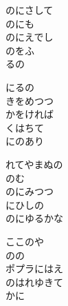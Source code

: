 \documentclass[10pt,b5j]{tarticle} %
\begin{document}
\vspace{1.5em} %
\newcommand{\linespace}{0.5em} %
\newcommand{\blocksize}{0.5\hsize} %
\begin{enumerate} %
    \begin{minipage}[c]{\blocksize}
    
        \vspace{\linespace}
        \item
        のにさして\\
        のにも\\
        のにえでし\\
        のをふ\\
        るの
        
        \vspace{\linespace}
        \item
        にるの\\
        きをめつつ\\
        かをければ\\
        くはちて\\
        にのあり
        
        \vspace{\linespace}
        \item
        れてやまぬの\\
        のむ\\
        のにみつつ\\
        にひしの\\
        のにゆるかな
        
        \vspace{\linespace}
        \item
        ここのや\\
        のの\\
        ポプラにはえ\\
        のはれゆきて\\
        かに
    
    \end{minipage}
\end{enumerate} %
\end{document}
